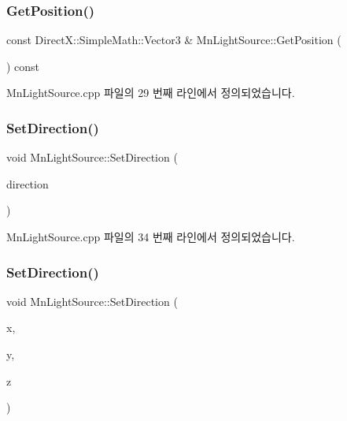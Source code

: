 \subsubsection{\texorpdfstring{Get\+Position()}{GetPosition()}}
{\footnotesize\ttfamily const Direct\+X\+::\+Simple\+Math\+::\+Vector3 \& Mn\+Light\+Source\+::\+Get\+Position (\begin{DoxyParamCaption}{ }\end{DoxyParamCaption}) const}



Mn\+Light\+Source.\+cpp 파일의 29 번째 라인에서 정의되었습니다.

\mbox{\label{class_m_n_l_1_1_mn_light_source_a7f9f5ae434cdbd9e34f6994a019ebd95}} 
\subsubsection{\texorpdfstring{Set\+Direction()}{SetDirection()}\hspace{0.1cm}{\footnotesize\ttfamily [1/2]}}
{\footnotesize\ttfamily void Mn\+Light\+Source\+::\+Set\+Direction (\begin{DoxyParamCaption}\item[{const Direct\+X\+::\+Simple\+Math\+::\+Vector3 \&}]{direction }\end{DoxyParamCaption})}



Mn\+Light\+Source.\+cpp 파일의 34 번째 라인에서 정의되었습니다.

\mbox{\label{class_m_n_l_1_1_mn_light_source_adef28f03e9e49b036cd1b8ead7d05498}} 
\subsubsection{\texorpdfstring{Set\+Direction()}{SetDirection()}\hspace{0.1cm}{\footnotesize\ttfamily [2/2]}}
{\footnotesize\ttfamily void Mn\+Light\+Source\+::\+Set\+Direction (\begin{DoxyParamCaption}\item[{float}]{x,  }\item[{float}]{y,  }\item[{float}]{z }\end{DoxyParamCaption})}



